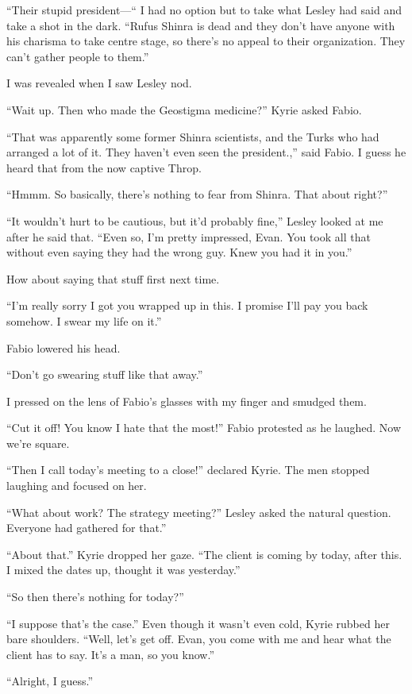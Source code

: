 \documentclass[oneside]{book}
\begin{document}
“Their stupid president—“ I had no option but to take what Lesley had said and take a shot in the dark. “Rufus Shinra is dead and they don’t have anyone with his charisma to take centre stage, so there’s no appeal to their organization. They can’t gather people to them.”

I was revealed when I saw Lesley nod.

“Wait up. Then who made the Geostigma medicine?” Kyrie asked Fabio.

“That was apparently some former Shinra scientists, and the Turks who had arranged a lot of it. They haven’t even seen the president.,” said Fabio. I guess he heard that from the now captive Throp.

“Hmmm. So basically, there’s nothing to fear from Shinra. That about right?”

“It wouldn’t hurt to be cautious, but it’d probably fine,” Lesley looked at me after he said that. “Even so, I’m pretty impressed, Evan. You took all that without even saying they had the wrong guy. Knew you had it in you.”

How about saying that stuff first next time.

“I’m really sorry I got you wrapped up in this. I promise I’ll pay you back somehow. I swear my life on it.”

Fabio lowered his head.

“Don’t go swearing stuff like that away.”

I pressed on the lens of Fabio’s glasses with my finger and smudged them.

“Cut it off! You know I hate that the most!” Fabio protested as he laughed. Now we’re square.

“Then I call today’s meeting to a close!” declared Kyrie. The men stopped laughing and focused on her.

“What about work? The strategy meeting?” Lesley asked the natural question. Everyone had gathered for that.”

“About that.” Kyrie dropped her gaze. “The client is coming by today, after this. I mixed the dates up, thought it was yesterday.”

“So then there’s nothing for today?”

“I suppose that’s the case.” Even though it wasn’t even cold, Kyrie rubbed her bare shoulders. “Well, let’s get off. Evan, you come with me and hear what the client has to say. It’s a man, so you know.”

“Alright, I guess.”
\end{document}
